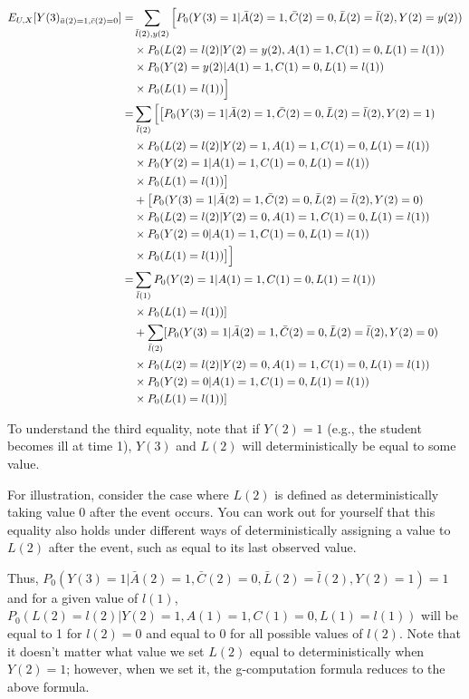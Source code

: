 \documentclass[answers]{exam}
\begin{document}
\begin{solution}
\begin{enumerate}
\begin{align*}
E_{U,X}[Y(3)_{\bar{a}(2)=1, \bar{c}(2)=0}] = & \sum_{\bar{l}(2), y(2)} \Big{[}P_0(Y(3) = 1 | \bar{A}(2) = 1, \bar{C}(2) = 0, \bar{L}(2) = \bar{l}(2), Y(2) = y(2)) \\
& \times P_0(L(2) = l(2) | Y(2) = y(2), A(1) = 1, C(1) = 0, L(1) = l(1)) \\
& \times P_0(Y(2) = y(2) | A(1) = 1, C(1) = 0, L(1) = l(1)) \\
& \times P_0(L(1) = l(1)) \Big{]}\\
= & \sum_{\bar{l}(2)} \Big{[}\big{[}P_0(Y(3) = 1 | \bar{A}(2) = 1, \bar{C}(2) = 0, \bar{L}(2) = \bar{l}(2), Y(2) = 1) \\
& \times P_0(L(2) = l(2) | Y(2) = 1, A(1) = 1, C(1) = 0, L(1) = l(1)) \\
& \times P_0(Y(2) = 1 | A(1) = 1, C(1) = 0, L(1) = l(1)) \\
& \times P_0(L(1) = l(1))\big{]} \\
& + \big{[}P_0(Y(3) = 1 | \bar{A}(2) = 1, \bar{C}(2) = 0, \bar{L}(2) = \bar{l}(2), Y(2) = 0) \\
& \times P_0(L(2) = l(2) | Y(2) = 0, A(1) = 1, C(1) = 0, L(1) = l(1)) \\
& \times P_0(Y(2) = 0 | A(1) = 1, C(1) = 0, L(1) = l(1)) \\
& \times P_0(L(1) = l(1))\big{]}\Big{]} \\
= & \sum_{\bar{l}(1)} P_0(Y(2) = 1 | A(1) = 1, C(1) = 0, L(1) = l(1)) \\
& \times P_0(L(1) = l(1)) ]\\
& + \sum_{\bar{l}(2)} [P_0(Y(3) = 1 | \bar{A}(2) = 1, \bar{C}(2) = 0, \bar{L}(2) = \bar{l}(2), Y(2) = 0) \\
& \times P_0(L(2) = l(2) | Y(2) = 0, A(1) = 1, C(1) = 0, L(1) = l(1)) \\
& \times P_0(Y(2) = 0 | A(1) = 1, C(1) = 0, L(1) = l(1)) \\
& \times P_0(L(1) = l(1))]
\end{align*}

To understand the third equality, note that if $Y(2) = 1$ (e.g., the student becomes ill at time 1), $Y(3)$ and $L(2)$ will deterministically be equal to some value.

For illustration, consider the case where $L(2)$ is defined as deterministically taking value 0 after the event occurs. You can work out for yourself that this equality also holds under different ways of deterministically assigning a value to $L(2)$ after the event, such as equal to its last observed value. 

Thus, $P_0(Y(3) = 1 | \bar{A}(2) = 1, \bar{C}(2) = 0, \bar{L}(2) = \bar{l}(2), Y(2) = 1) = 1$ and for a given value of $l(1)$, $P_0(L(2) = l(2) | Y(2) = 1, A(1) = 1, C(1) = 0, L(1) = l(1))$ will be equal to 1 for $l(2) = 0$ and equal to 0 for all possible values of $l(2)$. Note that it doesn't matter what value we set $L(2)$ equal to deterministically when $Y(2) = 1$; however, when we set it, the g-computation formula reduces to the above formula. 

\end{enumerate}
\end{solution}
\end{document}

